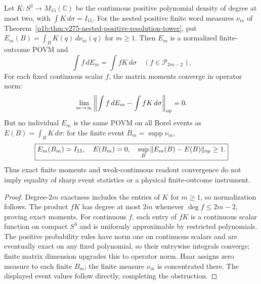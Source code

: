 \documentclass[11pt,a4paper]{article}
\begin{document}
\begin{corollary}
\label{p2f:cor:v275-endpoint-finite-tower}
Let $K:S^3\to M_{15}(\mathbb C)$ be the continuous positive
polynomial density of degree at most two, with
$\int K\,d\sigma=I_{15}$. For the nested positive finite word
measures $\nu_m$ of
Theorem~\ref{p1b:thm:v275-nested-positive-resolution-tower},
put $E_m(B)=\int_B K(q)\,d\nu_m(q)$ for $m\ge1$. Then
$E_m$ is a normalized finite-outcome POVM and
\[
 \int f\,dE_m=\int fK\,d\sigma
 \quad(f\in\mathcal P_{2m-2}).
\]
For each fixed continuous scalar $f$, the matrix moments converge
in operator norm:
\[
 \lim_{m\to\infty}
 \left\|\int f\,dE_m-\int fK\,d\sigma\right\|_{\rm op}=0.
\]
But no individual $E_m$ is the same POVM on all Borel events as
$E(B)=\int_BK\,d\sigma$: for the finite event
$B_m=\operatorname{supp}\nu_m$,
\[
 \boxed{E_m(B_m)=I_{15},\quad E(B_m)=0,\quad
 \sup_B\|E_m(B)-E(B)\|_{\rm op}\ge1.}
\]
Thus exact finite moments and weak-continuous readout convergence
do not imply equality of sharp event statistics or a physical
finite-outcome instrument.
\end{corollary}
\begin{proof}
Degree-$2m$ exactness includes the entries of $K$ for $m\ge1$,
so normalization follows. The product $fK$ has degree at most
$2m$ whenever $\deg f\le2m-2$, proving exact moments.
For continuous $f$, each entry of $fK$ is a continuous scalar
function on compact $S^3$ and is uniformly approximable by
restricted polynomials. The positive probability rules have
norm one on continuous scalars and are eventually exact on
any fixed polynomial, so their entrywise integrals converge;
finite matrix dimension upgrades this to operator norm.
Haar assigns zero measure to each finite $B_m$; the finite
measure $\nu_m$ is concentrated there. The displayed event
values follow directly, completing the obstruction.
\end{proof}
\end{document}
